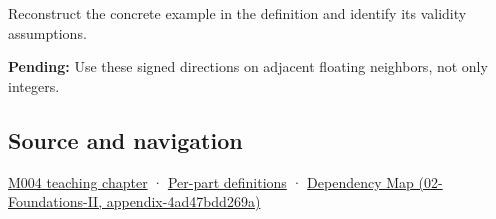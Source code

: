 Reconstruct the concrete example in the definition and identify its validity assumptions.

\textbf{Pending:} Use these signed directions on adjacent floating neighbors, not only integers.

\subsection{Source and navigation}\label{appendix-637d164ae5ca-source-and-navigation}

\hyperref[01-foundations-i-ch001-a-stretching-ruler-for-real-valued-quantities]{M004 teaching chapter} · \hyperref[appendix-fd090d982a15-m004---parts-61-76]{Per-part definitions} · \href{../02-Foundations-II/main.pdf\#nameddest=appendix-4ad47bdd269a}{Dependency Map (02-Foundations-II, appendix-4ad47bdd269a)}

